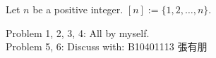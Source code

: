 \begin{nota}
Let $n$ be a positive integer. $[n]:=\{1, 2, \dots, n\}$.
\end{nota}

\setcounter{pr}{-1}

\begin{pr}$ $\\
Problem 1, 2, 3, 4: All by myself.\\
Problem 5, 6: Discuss with: B10401113 張有朋%
\end{pr}

